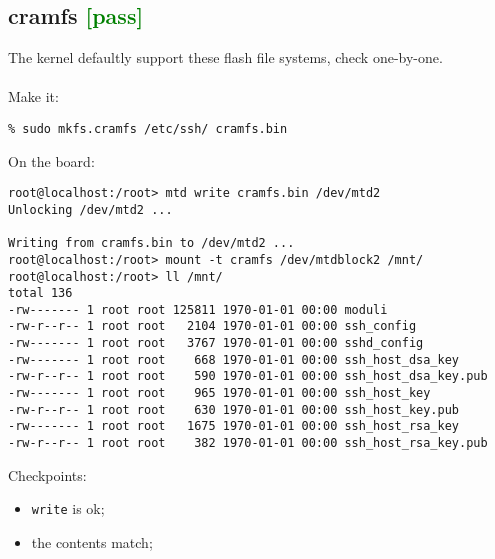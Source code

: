 \documentclass[a4paper]{report}
\begin{document}
\subsection{cramfs \textcolor{green}{[pass]}}
The kernel defaultly support these flash file systems, check one-by-one.\\\\
Make it:
\begin{lstlisting}
% sudo mkfs.cramfs /etc/ssh/ cramfs.bin
\end{lstlisting}
On the board:
\begin{lstlisting}
root@localhost:/root> mtd write cramfs.bin /dev/mtd2
Unlocking /dev/mtd2 ...

Writing from cramfs.bin to /dev/mtd2 ...     
root@localhost:/root> mount -t cramfs /dev/mtdblock2 /mnt/
root@localhost:/root> ll /mnt/
total 136
-rw------- 1 root root 125811 1970-01-01 00:00 moduli
-rw-r--r-- 1 root root   2104 1970-01-01 00:00 ssh_config
-rw------- 1 root root   3767 1970-01-01 00:00 sshd_config
-rw------- 1 root root    668 1970-01-01 00:00 ssh_host_dsa_key
-rw-r--r-- 1 root root    590 1970-01-01 00:00 ssh_host_dsa_key.pub
-rw------- 1 root root    965 1970-01-01 00:00 ssh_host_key
-rw-r--r-- 1 root root    630 1970-01-01 00:00 ssh_host_key.pub
-rw------- 1 root root   1675 1970-01-01 00:00 ssh_host_rsa_key
-rw-r--r-- 1 root root    382 1970-01-01 00:00 ssh_host_rsa_key.pub
\end{lstlisting}
Checkpoints:
\begin{itemize}
    \item {\tt write} is ok;
    \item the contents match;
\end{itemize}
\end{document}
